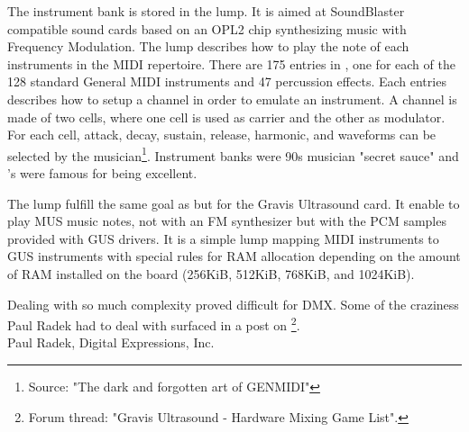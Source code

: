 \par
The instrument bank is stored in the  lump. It is aimed at SoundBlaster compatible sound cards based on an OPL2 chip synthesizing music with Frequency Modulation. The lump describes how to play the note of each instruments in the MIDI repertoire. There are 175 entries in , one for each of the 128 standard General MIDI instruments and 47 percussion effects. Each entries describes how to setup a channel in order to emulate an instrument. A channel is made of two cells, where one cell is used as carrier and the other as modulator. For each cell, attack, decay, sustain, release, harmonic, and waveforms can be selected by the musician\footnote{Source: "The dark and forgotten art of GENMIDI" }. Instrument banks were 90s musician "secret sauce" and \doom's were famous for being excellent.\\
\par
The  lump fulfill the same goal as  but for the Gravis Ultrasound card. It enable to play MUS music notes, not with an FM synthesizer but with the PCM samples provided with GUS drivers. It is a simple lump mapping MIDI instruments to GUS instruments with special rules for RAM allocation depending on the amount of RAM installed on the board (256KiB, 512KiB, 768KiB, and 1024KiB).\pagebreak



Dealing with so much complexity proved difficult for DMX. Some of the craziness Paul Radek had to deal with surfaced in a post on \footnote{Forum thread: "Gravis Ultrasound - Hardware Mixing Game List".}.\\





{Paul Radek, Digital Expressions, Inc.}\\
\par

